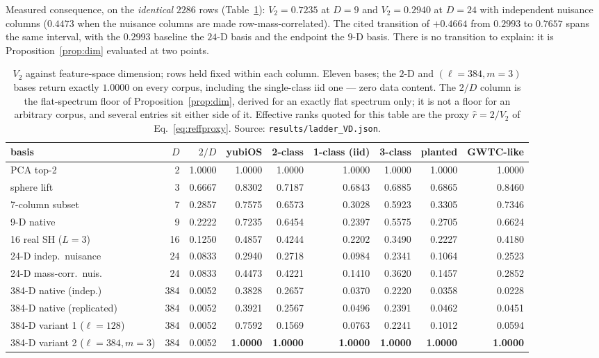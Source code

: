 \documentclass[11pt,a4paper]{article}
\theoremstyle{plain}
\theoremstyle{remark}
\theoremstyle{plain}
\begin{document}
Measured consequence, on the \emph{identical} $2286$ rows (Table~\ref{tab:ladder}): $V_2=0.7235$ at $D=9$ and $V_2=0.2940$ at $D=24$ with independent nuisance columns ($0.4473$ when the nuisance columns are made row-mass-correlated). The cited transition of $+0.4664$ from $0.2993$ to $0.7657$ spans the same interval, with the $0.2993$ baseline the $24$-D basis and the endpoint the $9$-D basis. There is no transition to explain: it is Proposition~\ref{prop:dim} evaluated at two points.

\begin{table}[h]
\centering
\small
\begin{tabular}{lrrrrrrrr}
\toprule
basis & $D$ & $2/D$ & yubiOS & 2-class & 1-class (iid) & 3-class & planted & GWTC-like \\
\midrule
PCA top-2             & 2   & 1.0000 & 1.0000 & 1.0000 & 1.0000 & 1.0000 & 1.0000 & 1.0000 \\
sphere lift           & 3   & 0.6667 & 0.8302 & 0.7187 & 0.6843 & 0.6885 & 0.6865 & 0.8460 \\
7-column subset       & 7   & 0.2857 & 0.7575 & 0.6573 & 0.3028 & 0.5923 & 0.3305 & 0.7346 \\
9-D native            & 9   & 0.2222 & 0.7235 & 0.6454 & 0.2397 & 0.5575 & 0.2705 & 0.6624 \\
16 real SH ($L{=}3$)  & 16  & 0.1250 & 0.4857 & 0.4244 & 0.2202 & 0.3490 & 0.2227 & 0.4180 \\
24-D indep.\ nuisance & 24  & 0.0833 & 0.2940 & 0.2718 & 0.0984 & 0.2341 & 0.1064 & 0.2523 \\
24-D mass-corr.\ nuis.& 24  & 0.0833 & 0.4473 & 0.4221 & 0.1410 & 0.3620 & 0.1457 & 0.2852 \\
384-D native (indep.)  & 384 & 0.0052 & 0.3828 & 0.2657 & 0.0370 & 0.2220 & 0.0358 & 0.0228 \\
384-D native (replicated) & 384 & 0.0052 & 0.3921 & 0.2567 & 0.0496 & 0.2391 & 0.0462 & 0.0451 \\
384-D variant 1 ($\ell{=}128$)       & 384 & 0.0052 & 0.7592 & 0.1569 & 0.0763 & 0.2241 & 0.1012 & 0.0594 \\
384-D variant 2 ($\ell{=}384,m{=}3$) & 384 & 0.0052 & \textbf{1.0000} & \textbf{1.0000} & \textbf{1.0000} & \textbf{1.0000} & \textbf{1.0000} & \textbf{1.0000} \\
\bottomrule
\end{tabular}
\caption{$V_2$ against feature-space dimension; rows held fixed within each column. Eleven bases; the $2$-D and $(\ell{=}384,m{=}3)$ bases return exactly $1.0000$ on every corpus, including the single-class iid one --- zero data content. The $2/D$ column is the flat-spectrum floor of Proposition~\ref{prop:dim}, derived for an exactly flat spectrum only; it is not a floor for an arbitrary corpus, and several entries sit either side of it. Effective ranks quoted for this table are the proxy $\hat r=2/V_2$ of Eq.~\eqref{eq:reffproxy}. Source: \texttt{results/ladder\_VD.json}.}
\label{tab:ladder}
\end{table}
\end{document}
